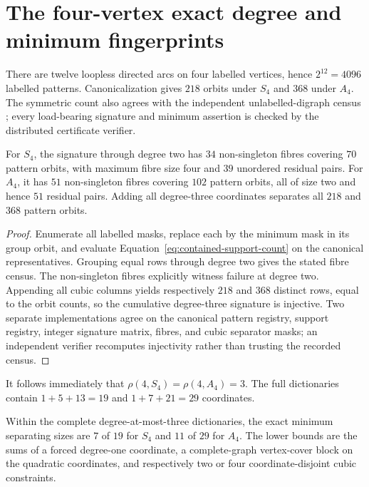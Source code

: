 \section{The four-vertex exact degree and minimum fingerprints}
\label{sec:n4}

There are twelve loopless directed arcs on four labelled vertices, hence
$2^{12}=4096$ labelled patterns.  Canonicalization gives $218$ orbits under
$S_4$ and $368$ under $A_4$.  The symmetric count also agrees with the
independent unlabelled-digraph census \cite{McKayDigraphData}; every
load-bearing signature and minimum assertion is checked by the distributed
certificate verifier.

\begin{proposition}
\label{prop:n4-collision}
For $S_4$, the signature through degree two has $34$ non-singleton fibres
covering $70$ pattern orbits, with maximum fibre size four and $39$ unordered
residual pairs.  For $A_4$, it has $51$ non-singleton fibres covering $102$
pattern orbits, all of size two and hence $51$ residual pairs.  Adding all
degree-three coordinates separates all $218$ and $368$ pattern orbits.
\end{proposition}

\begin{proof}
Enumerate all labelled masks, replace each by the minimum mask in its group
orbit, and evaluate Equation~\eqref{eq:contained-support-count} on the
canonical representatives.  Grouping equal rows through degree two gives the
stated fibre census.  The non-singleton fibres explicitly witness failure at
degree two.  Appending all cubic columns yields respectively $218$ and $368$
distinct rows, equal to the orbit counts, so the cumulative degree-three
signature is injective.  Two separate implementations agree on the
canonical pattern registry, support registry, integer signature matrix,
fibres, and cubic separator masks; an independent verifier recomputes
injectivity rather than trusting the recorded census.
\end{proof}

It follows immediately that $\rho(4,S_4)=\rho(4,A_4)=3$.  The full dictionaries
contain $1+5+13=19$ and $1+7+21=29$ coordinates.

\begin{theorem}
\label{thm:n4-minimum}
Within the complete degree-at-most-three dictionaries, the exact minimum
separating sizes are $7$ of $19$ for $S_4$ and $11$ of $29$ for $A_4$.
The lower bounds are the sums of a forced degree-one coordinate, a
complete-graph vertex-cover block on the quadratic coordinates, and
respectively two or four coordinate-disjoint cubic constraints.
\end{theorem}

